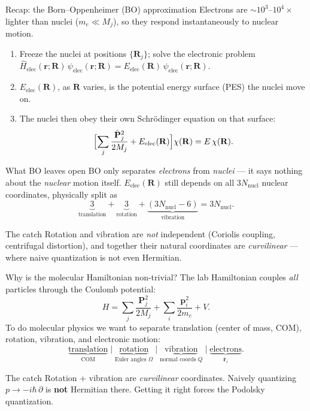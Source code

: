 \documentclass[aspectratio=169,10pt]{beamer}
\newcommand{\stagenum}{0}
\newcommand{\setstage}[1]{\renewcommand{\stagenum}{#1}}
\begin{document}
\begin{frame}{Recap: the Born--Oppenheimer (BO) approximation}
\setstage{0}
Electrons are $\sim\!10^3$--$10^4\times$ lighter than nuclei ($m_e\ll M_j$), so they respond \alert{instantaneously} to nuclear motion.
\begin{enumerate}
  \item Freeze the nuclei at positions $\{\mathbf R_j\}$; solve the electronic problem $\hat H_{\mathrm{elec}}(\mathbf r;\mathbf R)\,\psi_{\mathrm{elec}}(\mathbf r;\mathbf R)=E_{\mathrm{elec}}(\mathbf R)\,\psi_{\mathrm{elec}}(\mathbf r;\mathbf R)$.
  \item $E_{\mathrm{elec}}(\mathbf R)$, as $\mathbf R$ varies, is the \alert{potential energy surface (PES)} the nuclei move on.
  \item The nuclei then obey their own Schr\"odinger equation on that surface:
  \begin{equation*}
  \Bigl[\sum_j\frac{\hat{\mathbf P}_j^2}{2M_j}+E_{\mathrm{elec}}(\mathbf R)\Bigr]\chi(\mathbf R)=E\,\chi(\mathbf R).
  \end{equation*}
\end{enumerate}
\end{frame}

\begin{frame}{What BO leaves open}
\setstage{0}
\footnotesize
\alert{BO only separates \emph{electrons} from \emph{nuclei}} --- it says nothing about the \emph{nuclear} motion itself. $E_{\mathrm{elec}}(\mathbf R)$ still depends on all $3N_{\mathrm{nucl}}$ nuclear coordinates, physically split as
\begin{equation*}
\underbrace{3}_{\text{translation}}+\underbrace{3}_{\text{rotation}}+\underbrace{(3N_{\mathrm{nucl}}-6)}_{\text{vibration}} = 3N_{\mathrm{nucl}} .
\end{equation*}
\pause
\begin{alertblock}{The catch}
Rotation and vibration are \emph{not} independent (Coriolis coupling, centrifugal distortion), and together their natural coordinates are \emph{curvilinear} --- where naive quantization is not even Hermitian.
\end{alertblock}
\end{frame}

\begin{frame}{Why is the molecular Hamiltonian non-trivial?}
\setstage{0}
The lab Hamiltonian couples \emph{all} particles through the Coulomb potential:
\[
H=\sum_j\frac{\mathbf P_j^2}{2M_j}+\sum_i\frac{\mathbf p_i^2}{2m_e}+V .
\]
To do molecular physics we want to separate translation (center of mass, \alert{COM}), rotation, vibration, and electronic motion:
\[
\underbrace{\text{translation}}_{\text{COM}}\;\big|\;\underbrace{\text{rotation}}_{\text{Euler angles }\Omega}\;\big|\;\underbrace{\text{vibration}}_{\text{normal coords }Q}\;\big|\;\underbrace{\text{electrons}}_{\bar{\mathbf r}_i}.
\]
\pause
\begin{alertblock}{The catch}
Rotation + vibration are \emph{curvilinear} coordinates. Naively quantizing
$p\to-i\hbar\,\partial$ is \textbf{not} Hermitian there. Getting it right forces the
Podolsky quantization.
\end{alertblock}
\end{frame}
\end{document}
